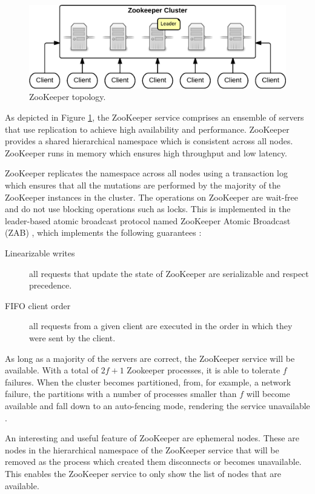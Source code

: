 \begin{figure}[ht!]
\centering
\includegraphics[width=.9\textwidth]{figures/zookeeper.png}
\caption{ZooKeeper topology. \label{fig:ZooKeeper}}
\end{figure}

As depicted in Figure \ref{fig:ZooKeeper}, the ZooKeeper service comprises an ensemble of servers that use replication to achieve high availability and performance. ZooKeeper provides a shared hierarchical namespace which is consistent across all nodes. ZooKeeper runs in memory which ensures high throughput and low latency.

ZooKeeper replicates the namespace across all nodes using a transaction log which ensures that all the mutations are performed by the majority of the ZooKeeper instances in the cluster. The operations on ZooKeeper are wait-free and do not use blocking operations such as locks. This is implemented in the leader-based atomic broadcast protocol named ZooKeeper Atomic Broadcast (ZAB) \cite{zab}, which implements the following guarantees \cite{Hunt:2010}:

\begin{description} 
    \item[Linearizable writes] all requests that update the state of ZooKeeper are serializable and respect precedence.
    \item[FIFO client order] all requests from a given client are executed in the order in which they were sent by the client.
\end{description}

As long as a majority of the servers are correct, the ZooKeeper service will be available. With a total of $2f+1$ Zookeeper processes, it is able to tolerate $f$ failures. When the cluster becomes partitioned, from, for example, a network failure, the partitions with a number of processes smaller than $f$ will become available and fall down to an auto-fencing mode, rendering the service unavailable \cite{0201619180}.

An interesting and useful feature of ZooKeeper are ephemeral nodes. These are nodes in the hierarchical namespace of the ZooKeeper service that will be removed as the process which created them disconnects or becomes unavailable. This enables the ZooKeeper service to only show the list of nodes that are available.

